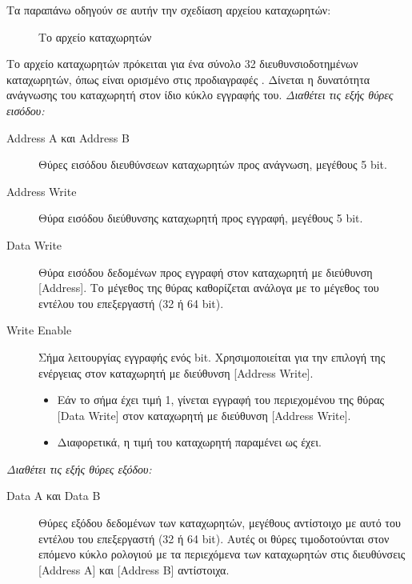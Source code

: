 \documentclass[11pt]{extarticle}
\begin{document}
Τα παραπάνω οδηγούν σε αυτήν την σχεδίαση αρχείου καταχωρητών:
\begin{figure}[H]
    \centering
    \caption[Αρχείο Καταχωρητών]{Το αρχείο καταχωρητών}
\end{figure}
Το αρχείο καταχωρητών πρόκειται για ένα σύνολο 32 διευθυνσιοδοτημένων καταχωρητών, όπως είναι ορισμένο στις προδιαγραφές \cite{spec}.
Δίνεται η δυνατότητα ανάγνωσης του καταχωρητή στον ίδιο κύκλο εγγραφής του.
\vspace{1em}
\newline
\textit{Διαθέτει τις εξής θύρες εισόδου:}
\begin{description}
 \item[Address A και Address B] Θύρες εισόδου διευθύνσεων καταχωρητών προς ανάγνωση, μεγέθους 5 bit. 
 \item[Address Write] Θύρα εισόδου διεύθυνσης καταχωρητή προς εγγραφή, μεγέθους 5 bit. 
 \item[Data Write] Θύρα εισόδου δεδομένων προς εγγραφή στον καταχωρητή με διεύθυνση [Address]. \newline
 Το μέγεθος της θύρας καθορίζεται ανάλογα με το μέγεθος του εντέλου του επεξεργαστή (32 ή 64 bit).
 \item[Write Enable] Σήμα λειτουργίας εγγραφής ενός bit. \newline
 Χρησιμοποιείται για την επιλογή της ενέργειας στον καταχωρητή με διεύθυνση [Address Write].
 \begin{itemize} 
    \item Εάν το σήμα έχει τιμή 1, γίνεται εγγραφή του περιεχομένου της θύρας [Data Write] στον καταχωρητή με διεύθυνση [Address Write].
    \item Διαφορετικά, η τιμή του καταχωρητή παραμένει ως έχει.
 \end{itemize}
\end{description}
\newpage
\textit{Διαθέτει τις εξής θύρες εξόδου:}
\begin{description}
 \item[Data A και Data B] Θύρες εξόδου δεδομένων των καταχωρητών, μεγέθους αντίστοιχο με αυτό του εντέλου του επεξεργαστή (32 ή 64 bit). \newline
 Αυτές οι θύρες τιμοδοτούνται στον επόμενο κύκλο ρολογιού με τα περιεχόμενα των καταχωρητών στις διευθύνσεις [Address A] και [Address B] αντίστοιχα.
\end{description}
\end{document}

